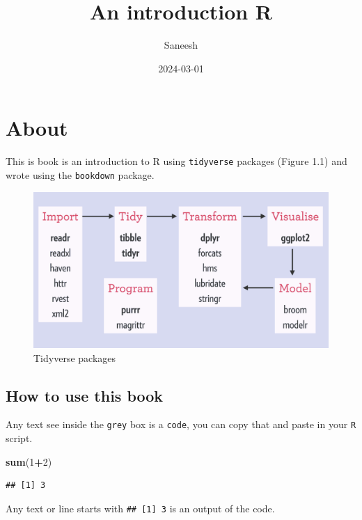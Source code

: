 \documentclass[
]{book}
\title{An introduction R}
\author{Saneesh}
\date{2024-03-01}
\newenvironment{Shaded}{\begin{snugshade}}{\end{snugshade}}
\newcommand{\DecValTok}[1]{\textcolor[rgb]{0.00,0.00,0.81}{#1}}
\newcommand{\FunctionTok}[1]{\textcolor[rgb]{0.13,0.29,0.53}{\textbf{#1}}}
\newcommand{\NormalTok}[1]{#1}
\newcommand{\SpecialCharTok}[1]{\textcolor[rgb]{0.81,0.36,0.00}{\textbf{#1}}}
\begin{document}
\maketitle

{
\hypersetup{linkcolor=}
\setcounter{tocdepth}{1}
\tableofcontents
}
\hypertarget{about}{%
\chapter{About}\label{about}}

This is book is an introduction to R using \texttt{tidyverse} packages (Figure 1.1) and wrote using the \texttt{bookdown} package.

\begin{figure}

{\centering \includegraphics[width=0.7\linewidth]{pictures/tidyverse-overview} 

}

\caption{Tidyverse packages}\label{fig:unnamed-chunk-1}
\end{figure}

\hypertarget{how-to-use-this-book}{%
\section{How to use this book}\label{how-to-use-this-book}}

Any text see inside the \texttt{grey} box is a \texttt{code}, you can copy that and paste in your \texttt{R} script.

\begin{Shaded}
\begin{Highlighting}[]
\FunctionTok{sum}\NormalTok{(}\DecValTok{1}\SpecialCharTok{+}\DecValTok{2}\NormalTok{)}
\end{Highlighting}
\end{Shaded}

\begin{verbatim}
## [1] 3
\end{verbatim}

Any text or line starts with \texttt{\#\#\ {[}1{]}\ 3} is an output of the code.
\end{document}
